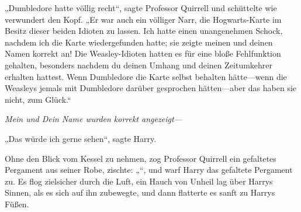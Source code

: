 „Dumbledore hatte völlig recht“, sagte Professor Quirrell und schüttelte wie verwundert den Kopf. „Er war auch ein völliger Narr, die Hogwarts-Karte im Besitz dieser beiden Idioten zu lassen. Ich hatte einen unangenehmen Schock, nachdem ich die Karte wiedergefunden hatte; sie zeigte meinen und deinen Namen korrekt an! Die Weasley-Idioten hatten es für eine bloße Fehlfunktion gehalten, besonders nachdem du deinen Umhang und deinen Zeitumkehrer erhalten hattest. Wenn Dumbledore die Karte selbst behalten hätte—wenn die Weasleys jemals mit Dumbledore darüber gesprochen hätten—aber das haben sie nicht, zum Glück.“

\emph{Mein und Dein Name wurden korrekt angezeigt—}

„Das würde ich gerne sehen“, sagte Harry.

Ohne den Blick vom Kessel zu nehmen, zog Professor Quirrell ein gefaltetes Pergament aus seiner Robe, zischte:
„“, und warf Harry das gefaltete Pergament zu.
Es flog zielsicher durch die Luft, ein Hauch von Unheil lag über Harrys Sinnen, als es sich auf ihn zubewegte, und dann flatterte es sanft zu Harrys Füßen.


